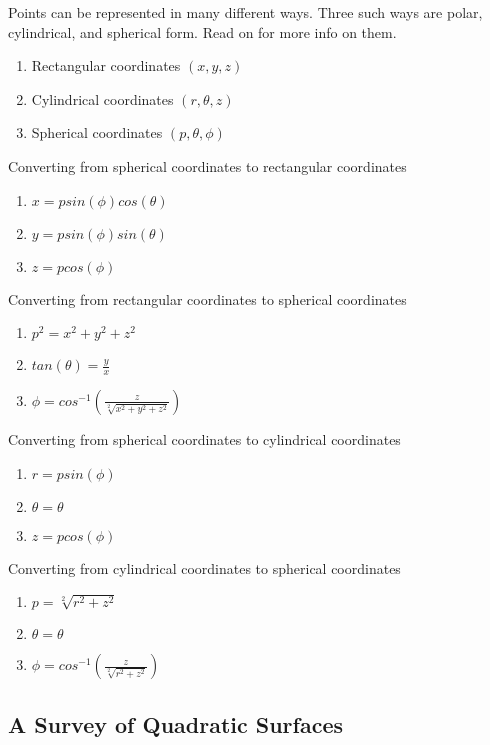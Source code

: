 \documentclass[12pt, letterpaper]{article}
\begin{document}
Points can be represented in many different ways. Three such ways are polar, cylindrical, and spherical form. Read on for more info on them.

\begin{enumerate}
    \item Rectangular coordinates \((x, y, z)\)
    \item Cylindrical coordinates \((r, \theta, z)\)
    \item Spherical coordinates \((p, \theta, \phi)\)
\end{enumerate}

Converting from spherical coordinates to rectangular coordinates
\begin{enumerate}
    \item \(x = psin(\phi)cos(\theta)\)
    \item \(y = psin(\phi)sin(\theta)\)
    \item \(z = pcos(\phi)\)
\end{enumerate}

Converting from rectangular coordinates to spherical coordinates
\begin{enumerate}
    \item \(p^2 = x^2 + y^2 + z^2\)
    \item \(tan(\theta) = \frac{y}{x}\)
    \item \(\phi = cos^{-1}(\frac{z}{\sqrt[2]{x^2 + y^2 + z^2}})\)
\end{enumerate}

\pagebreak Converting from spherical coordinates to cylindrical coordinates
\begin{enumerate}
    \item \(r = psin(\phi)\)
    \item \(\theta = \theta\)
    \item \(z = pcos(\phi)\)
\end{enumerate}

Converting from cylindrical coordinates to spherical coordinates
\begin{enumerate}
    \item \(p = \sqrt[2]{r^2 + z^2}\)
    \item \(\theta = \theta\)
    \item \(\phi = cos^{-1}(\frac{z}{\sqrt[2]{r^2 + z^2}})\)
\end{enumerate}

\subsection{A Survey of Quadratic Surfaces}
\end{document}
